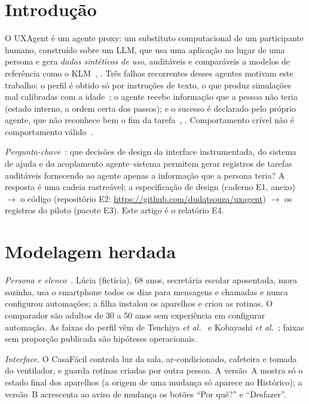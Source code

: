 \documentclass[conference]{IEEEtran}
\newcommand{\repo}{\url{https://github.com/dudatsouza/uxagent}}
\begin{document}
\section{Introdução}
O UXAgent é um agente proxy: um substituto computacional de um participante humano, construído sobre um LLM, que usa uma aplicação no lugar de uma persona e gera \textit{dados sintéticos de uso}, auditáveis e comparáveis a modelos de referência como o KLM~\cite{lara2026p3}, \cite{lu2025uxagent}. Três falhas recorrentes desses agentes motivam este trabalho: o perfil é obtido só por instruções de texto, o que produz simulações mal calibradas com a idade~\cite{seshadri2026}; o agente recebe informação que a pessoa não teria (estado interno, a ordem certa dos passos); e o sucesso é declarado pelo próprio agente, que não reconhece bem o fim da tarefa~\cite{griesbach2026}, \cite{zhou2026}. Comportamento crível não é comportamento válido~\cite{park2023}.

\textit{Pergunta-chave}~\cite{lara2026p3}: que decisões de design da interface instrumentada, do sistema de ajuda e do acoplamento agente--sistema permitem gerar registros de tarefas auditáveis fornecendo ao agente apenas a informação que a persona teria? A resposta é uma cadeia rastreável: a especificação de design (caderno E1, anexo) $\rightarrow$ o código (repositório E2: \repo) $\rightarrow$ os registros do piloto (pacote E3). Este artigo é o relatório E4.

\section{Modelagem herdada}
\textit{Persona e elenco}~\cite{lacerda2026faseII}. Lúcia (fictícia), 68 anos, secretária escolar aposentada, mora sozinha, usa o smartphone todos os dias para mensagens e chamadas e nunca configurou automações; a filha instalou os aparelhos e criou as rotinas. O comparador são adultos de 30 a 50 anos sem experiência em configurar automação. As faixas do perfil vêm de Tsuchiya \textit{et al.}~\cite{tsuchiya2018} e Kobayashi \textit{et al.}~\cite{kobayashi2011}; faixas sem proporção publicada são hipóteses operacionais.

\textit{Interface.} O CasaFácil controla luz da sala, ar-condicionado, cafeteira e tomada do ventilador, e guarda rotinas criadas por outra pessoa. A versão~A mostra só o estado final dos aparelhos (a origem de uma mudança só aparece no Histórico); a versão~B acrescenta ao aviso de mudança os botões ``Por quê?'' e ``Desfazer''.
\end{document}
